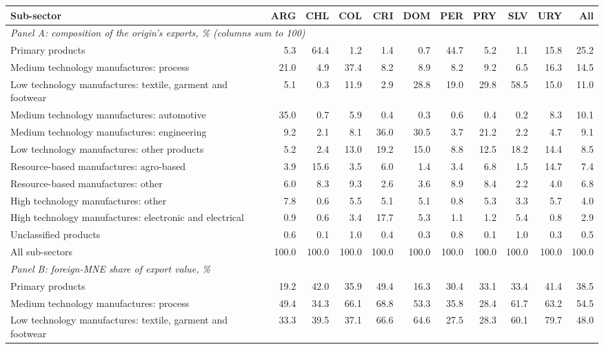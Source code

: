 \begin{tabular}{lrrrrrrrrrr}
\toprule
Sub-sector & ARG & CHL & COL & CRI & DOM & PER & PRY & SLV & URY & All \\
\midrule
\multicolumn{11}{l}{\textit{Panel A: composition of the origin's exports, \% (columns sum to 100)}} \\
Primary products & 5.3 & 64.4 & 1.2 & 1.4 & 0.7 & 44.7 & 5.2 & 1.1 & 15.8 & 25.2 \\
Medium technology manufactures: process & 21.0 & 4.9 & 37.4 & 8.2 & 8.9 & 8.2 & 9.2 & 6.5 & 16.3 & 14.5 \\
Low technology manufactures: textile, garment and footwear & 5.1 & 0.3 & 11.9 & 2.9 & 28.8 & 19.0 & 29.8 & 58.5 & 15.0 & 11.0 \\
Medium technology manufactures: automotive & 35.0 & 0.7 & 5.9 & 0.4 & 0.3 & 0.6 & 0.4 & 0.2 & 8.3 & 10.1 \\
Medium technology manufactures: engineering & 9.2 & 2.1 & 8.1 & 36.0 & 30.5 & 3.7 & 21.2 & 2.2 & 4.7 & 9.1 \\
Low technology manufactures: other products & 5.2 & 2.4 & 13.0 & 19.2 & 15.0 & 8.8 & 12.5 & 18.2 & 14.4 & 8.5 \\
Resource-based manufactures: agro-based & 3.9 & 15.6 & 3.5 & 6.0 & 1.4 & 3.4 & 6.8 & 1.5 & 14.7 & 7.4 \\
Resource-based manufactures: other & 6.0 & 8.3 & 9.3 & 2.6 & 3.6 & 8.9 & 8.4 & 2.2 & 4.0 & 6.8 \\
High technology manufactures: other & 7.8 & 0.6 & 5.5 & 5.1 & 5.1 & 0.8 & 5.3 & 3.3 & 5.7 & 4.0 \\
High technology manufactures: electronic and electrical & 0.9 & 0.6 & 3.4 & 17.7 & 5.3 & 1.1 & 1.2 & 5.4 & 0.8 & 2.9 \\
Unclassified products & 0.6 & 0.1 & 1.0 & 0.4 & 0.3 & 0.8 & 0.1 & 1.0 & 0.3 & 0.5 \\
All sub-sectors & 100.0 & 100.0 & 100.0 & 100.0 & 100.0 & 100.0 & 100.0 & 100.0 & 100.0 & 100.0 \\
\midrule
\multicolumn{11}{l}{\textit{Panel B: foreign-MNE share of export value, \%}} \\
Primary products & 19.2 & 42.0 & 35.9 & 49.4 & 16.3 & 30.4 & 33.1 & 33.4 & 41.4 & 38.5 \\
Medium technology manufactures: process & 49.4 & 34.3 & 66.1 & 68.8 & 53.3 & 35.8 & 28.4 & 61.7 & 63.2 & 54.5 \\
Low technology manufactures: textile, garment and footwear & 33.3 & 39.5 & 37.1 & 66.6 & 64.6 & 27.5 & 28.3 & 60.1 & 79.7 & 48.0 \\

\end{tabular}

